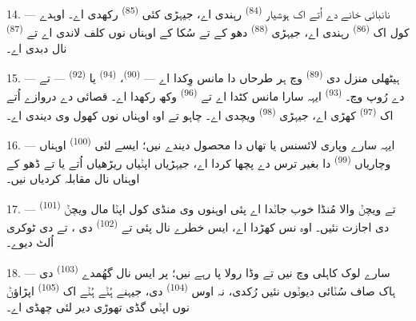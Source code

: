 14. --- نانبائی خانے دے اُتے اک ہوشیار  \textsuperscript{(84)}
رہندی اے، جیہڑی کئی  \textsuperscript{(85)} رکھدی اے۔
اوہدے کول اک  \textsuperscript{(86)} رہندی اے، جیہڑی
 \textsuperscript{(88)} دھو کے تے سُکا کے اوہناں نوں کلف لاندی اے تے
 \textsuperscript{(87)} نال دبدی اے۔

\VUsaut{4.0mm}
\VUsaut{3.0mm}

15. --- ہیٹھلی منزل دی  \textsuperscript{(89)} وچ ہر طرحاں دا
مانس وِکدا اے —  \textsuperscript{(90)}، 
\textsuperscript{(94)} یا  \textsuperscript{(92)} —  تے  دے رُوپ وچ۔ 
\textsuperscript{(93)} ایہہ سارا مانس کٹدا اے تے 
\textsuperscript{(96)} وکھ رکھدا اے۔ قصائی دے دروازے اُتے اک 
\textsuperscript{(97)} کھڑی اے، جیہڑی  \textsuperscript{(98)} ویچدی اے۔
چاہو تے اوہ اوہناں نوں کھول وی دیندی اے۔

16. --- ایہہ سارے وپاری لائسنس یا تھاں دا محصول دیندے نیں؛ ایسے لئی 
\textsuperscript{(100)} اوہناں وچاریاں 
\textsuperscript{(99)} دا بغیر ترس دے پچھا کردا اے، جیہڑیاں اپݨیاں ریڑھیاں اُتے
 یا  تے  ڈھو کے اوہناں نال مقابلہ کردیاں نیں۔

\VUsaut{4.0mm}
\VUsaut{3.0mm}

17. ---  \textsuperscript{(101)} تے  ویچݨ والا مُنڈا خوب
جاݨدا اے پئی اوہنوں وی منڈی کول اپݨا مال ویچݨ دی اجازت نئیں۔ اوہ نس کھڑدا اے، ایس
خطرے نال پئی  تے  
\textsuperscript{(102)} دی ،  تے  دی
ٹوکری اُلٹ دیوے۔

18. --- سارے لوک کاہلی وچ نیں تے وڈا رولا پا رہے نیں؛ پر ایس نال گھُمدے
 \textsuperscript{(103)} دی ہاک صاف سُݨائی دیوݨوں نئیں رُکدی، نہ اوس
 \textsuperscript{(104)} دی، جیہنے ہُݨے ہُݨے اک
 \textsuperscript{(105)} اپڑاؤݨ نوں اپݨی گڈی تھوڑی دیر لئی
چھڈی اے۔
\VUsaut{6.0mm}
\VUfilet{22mm}
